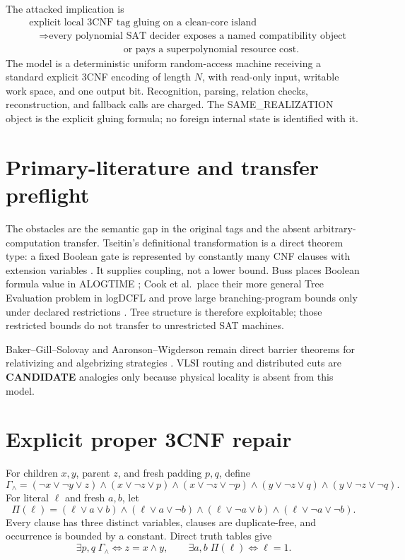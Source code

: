 \documentclass[11pt]{article}
\newcommand{\CAND}{\textbf{CANDIDATE}}
\begin{document}
The attacked implication is
\[
\begin{split}
&\text{explicit local 3CNF tag gluing on a clean-core island}\\
&\quad\Longrightarrow
\text{every polynomial SAT decider exposes a named compatibility object}\\
&\hspace{4cm}\text{or pays a superpolynomial resource cost}.
\end{split}\tag{TG-H}
\]
The model is a deterministic uniform random-access machine receiving a
standard explicit 3CNF encoding of length \(N\), with read-only input,
writable work space, and one output bit.  Recognition, parsing, relation
checks, reconstruction, and fallback calls are charged.  The
SAME\_REALIZATION object is the explicit gluing formula; no foreign internal
state is identified with it.

\section{Primary-literature and transfer preflight}

The obstacles are the semantic gap in the original tags and the absent
arbitrary-computation transfer.  Tseitin's definitional transformation is a
direct theorem type: a fixed Boolean gate is represented by constantly many
CNF clauses with extension variables \cite{Tseitin}.  It supplies coupling,
not a lower bound.  Buss places Boolean formula value in ALOGTIME
\cite{Buss}; Cook et al.\ place their more general Tree Evaluation problem in
logDCFL and prove large branching-program bounds only under declared
restrictions \cite{TreeEval}.  Tree structure is therefore exploitable; those
restricted bounds do not transfer to unrestricted SAT machines.

Baker--Gill--Solovay and Aaronson--Wigderson remain direct barrier theorems
for relativizing and algebrizing strategies \cite{BGS,AW}.  VLSI routing and
distributed cuts are \CAND{} analogies only because physical locality is
absent from this model.

\section{Explicit proper 3CNF repair}

For children \(x,y\), parent \(z\), and fresh padding \(p,q\), define
\[
\Gamma_{\wedge}=
(\neg x\vee\neg y\vee z)
\wedge(x\vee\neg z\vee p)\wedge(x\vee\neg z\vee\neg p)
\wedge(y\vee\neg z\vee q)\wedge(y\vee\neg z\vee\neg q).
\tag{1}
\]
For literal \(\ell\) and fresh \(a,b\), let
\[
\Pi(\ell)=
(\ell\vee a\vee b)\wedge(\ell\vee a\vee\neg b)
\wedge(\ell\vee\neg a\vee b)\wedge(\ell\vee\neg a\vee\neg b).
\tag{2}
\]
Every clause has three distinct variables, clauses are duplicate-free, and
occurrence is bounded by a constant.  Direct truth tables give
\[
\exists p,q\;\Gamma_{\wedge}\Longleftrightarrow z=x\wedge y,
\qquad
\exists a,b\;\Pi(\ell)\Longleftrightarrow \ell=1.
\tag{3}
\]
\end{document}
